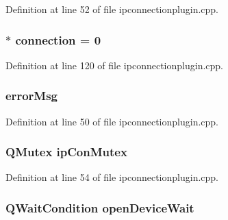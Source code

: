 Definition at line 52 of file ipconnectionplugin.\-cpp.

\hypertarget{group___i_p_conn_plugin_ga75cb9b33b52928c030806876f2c2f439}{
\subsubsection[{connection}]{$\ast$ connection = 0}}\label{group___i_p_conn_plugin_ga75cb9b33b52928c030806876f2c2f439}


Definition at line 120 of file ipconnectionplugin.\-cpp.

\hypertarget{group___i_p_conn_plugin_ga2146099b9930944186a7ecc208950d22}{
\subsubsection[{error\-Msg}]{ error\-Msg}}\label{group___i_p_conn_plugin_ga2146099b9930944186a7ecc208950d22}


Definition at line 50 of file ipconnectionplugin.\-cpp.

\hypertarget{group___i_p_conn_plugin_gae78cf6a3d1073c22be5cc8054ae1e8d6}{
\subsubsection[{ip\-Con\-Mutex}]{\setlength{\rightskip}{0pt plus 5cm}Q\-Mutex ip\-Con\-Mutex}}\label{group___i_p_conn_plugin_gae78cf6a3d1073c22be5cc8054ae1e8d6}


Definition at line 54 of file ipconnectionplugin.\-cpp.

\hypertarget{group___i_p_conn_plugin_ga1724de889bbf979017a390aae2554bbd}{
\subsubsection[{open\-Device\-Wait}]{\setlength{\rightskip}{0pt plus 5cm}Q\-Wait\-Condition open\-Device\-Wait}}\label{group___i_p_conn_plugin_ga1724de889bbf979017a390aae2554bbd}


